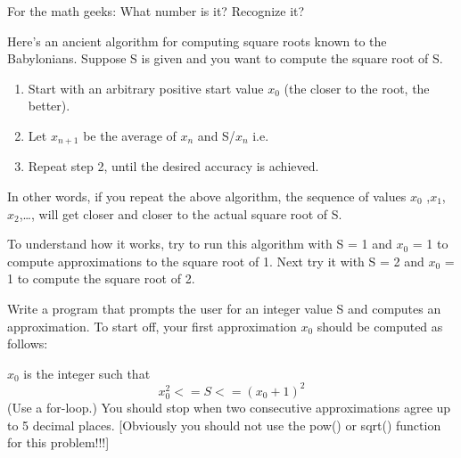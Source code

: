 For the math geeks: What number is it? Recognize it?

\begin{ex} Here's an ancient algorithm for computing
square roots known to the Babylonians. Suppose S is given and you want
to compute the square root of S.

\begin{enumerate}
\item
  Start with an arbitrary positive start value $x_0$
  (the closer to the root, the better).
\item
  Let $x_{n+1}$ be the average of
  $x_n$ and S/$x_n$ i.e.
\item
  Repeat step 2, until the desired accuracy is achieved.
\end{enumerate}
\end{ex}
In other words, if you repeat the above algorithm, the sequence of
values $x_0$ ,$x_1$, $x_2$,\ldots, will get closer and closer to the actual square root of S.

To understand how it works, try to run this algorithm with S = 1 and
$x_0$ = 1 to compute approximations to the square root of 1. Next try it with S = 2 and $x_0$ = 1 to compute the square root of 2.

Write a program that prompts the user for an integer value S and computes an approximation. To start off, your first approximation $x_0$ should be computed as follows:

$x_0$ is the integer such that
\[x_0^2 <= S <= (x_0 + 1)^2\]
(Use a for-loop.) You should stop when two consecutive approximations
agree up to 5 decimal places. [Obviously you should not use the pow()
or sqrt() function for this problem!!!]

